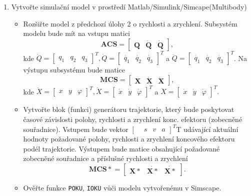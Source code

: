 \documentclass{article}
\begin{document}
				\begin{enumerate}
					\item Vytvořte simulační model v prostředí Matlab/Simulink/Simcape(Multibody)\\
					\begin{itemize}
						\item Rozšiřte model z předchozí úlohy 2 o rychlosti a zrychlení. Subsystém modelu bude
						mít na vstupu matici \[\mathbf{ACS} = \begin{bmatrix}\mathbf{Q}& \dot{\mathbf{Q}}& \dot{\mathbf{Q}}
						\end{bmatrix},\]
						kde \(\dot{Q} = \begin{bmatrix}q_1&q_2&q_3\end{bmatrix}^T,\dot{Q} = \begin{bmatrix}\dot{q_1}&\dot{q_2}&\dot{q_3}\end{bmatrix}^T\) a \(\ddot{Q}=\begin{bmatrix}\dot{q_1}&\dot{q_2}&\dot{q_3}\end{bmatrix}^T\). Na výstupu subsystému bude matice \[\mathbf{MCS} = \begin{bmatrix}\mathbf{X}& \dot{\mathbf{X}}& \dot{\mathbf{X}}
						\end{bmatrix},\]
						kde \(\dot{X} = \begin{bmatrix}x&y&\varphi\end{bmatrix}^T,\dot{X} = \begin{bmatrix}\dot{x}&\dot{y}&\dot{\varphi}\end{bmatrix}^T\) a \(\ddot{X}=\begin{bmatrix}\dot{x}&\dot{y}&\dot{\varphi}\end{bmatrix}^T.\)\\
						\item Vytvořte blok (funkci) generátoru trajektorie, který bude poskytovat časové závislosti polohy, rychlosti a zrychlení konc. efektoru (zobecněné souřadnice). Vstupem
						bude vektor \(\begin{bmatrix}&s&v&a\end{bmatrix}^T\)T udávající aktuální hodnoty požadované polohy, rychlosti a zrychlení koncového efektoru podél trajektorie. Výstupem bude matice obsahující požadované zobecněné souřadnice a příslušné rychlosti a zrychlení
						\[\mathbf{MCS*} = \begin{bmatrix}\mathbf{X*}& \dot{\mathbf{X*}}& \dot{\mathbf{X*}}
						\end{bmatrix}.\]
						\item Ověřte funkce \verb|POKU|, \verb|IOKU| vůči modelu vytvořenému v Simscape.\\

\end{itemize}
\end{enumerate}
\end{document}
